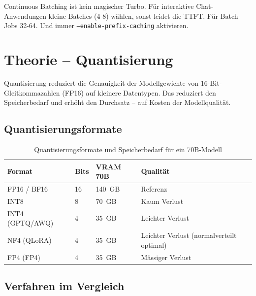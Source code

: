 \begin{praxishinweis}
Continuous Batching ist kein magischer Turbo. Für interaktive Chat-Anwendungen kleine Batches (4-8) wählen, sonst leidet die TTFT. Für Batch-Jobs 32-64. Und immer \texttt{--enable-prefix-caching} aktivieren.
\end{praxishinweis}

\section{Theorie -- Quantisierung}

Quantisierung reduziert die Genauigkeit der Modellgewichte von 16-Bit-Gleitkommazahlen (FP16) auf kleinere Datentypen. Das reduziert den Speicherbedarf und erhöht den Durchsatz -- auf Kosten der Modellqualität.

\subsection{Quantisierungsformate}

\begin{table}[H]
\centering
\begin{tabularx}{\linewidth}{lXXX}
\toprule
\textbf{Format} & \textbf{Bits} & \textbf{VRAM 70B} & \textbf{Qualität} \\
\midrule
FP16 / BF16 & 16 & 140~GB & Referenz \\
INT8 & 8 & 70~GB & Kaum Verlust \\
INT4 (GPTQ/AWQ) & 4 & 35~GB & Leichter Verlust \\
NF4 (QLoRA) & 4 & 35~GB & Leichter Verlust (normalverteilt optimal) \\
FP4 (FP4) & 4 & 35~GB & Mässiger Verlust \\
\bottomrule
\end{tabularx}
\caption{Quantisierungsformate und Speicherbedarf für ein 70B-Modell}
\label{tab:quant-formats}
\end{table}

\subsection{Verfahren im Vergleich}

